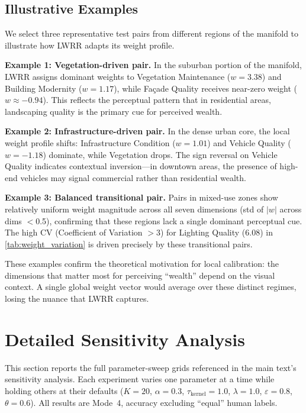\documentclass[runningheads]{llncs}
\begin{document}
\subsection{Illustrative Examples}

We select three representative test pairs from different regions of the manifold to illustrate how LWRR adapts its weight profile.

\medskip\noindent\textbf{Example 1: Vegetation-driven pair.}
In the suburban portion of the manifold, LWRR assigns dominant weights to Vegetation Maintenance ($w{=}3.38$) and Building Modernity ($w{=}1.17$), while Fa\c{c}ade Quality receives near-zero weight ($w{\approx}-0.94$).
This reflects the perceptual pattern that in residential areas, landscaping quality is the primary cue for perceived wealth.

\medskip\noindent\textbf{Example 2: Infrastructure-driven pair.}
In the dense urban core, the local weight profile shifts: Infrastructure Condition ($w{=}1.01$) and Vehicle Quality ($w{=}-1.18$) dominate, while Vegetation drops.
The sign reversal on Vehicle Quality indicates contextual inversion---in downtown areas, the presence of high-end vehicles may signal commercial rather than residential wealth.

\medskip\noindent\textbf{Example 3: Balanced transitional pair.}
Pairs in mixed-use zones show relatively uniform weight magnitude across all seven dimensions (std of $|w|$ across dims $<$0.5), confirming that these regions lack a single dominant perceptual cue.
The high CV (Coefficient of Variation $>$3) for Lighting Quality (6.08) in \cref{tab:weight_variation} is driven precisely by these transitional pairs.

\medskip
These examples confirm the theoretical motivation for local calibration: the dimensions that matter most for perceiving ``wealth'' depend on the visual context.
A single global weight vector would average over these distinct regimes, losing the nuance that LWRR captures.


\section{Detailed Sensitivity Analysis}
\label{sec:sensitivity_full}

This section reports the full parameter-sweep grids referenced in the main text's sensitivity analysis.
Each experiment varies one parameter at a time while holding others at their defaults ($K{=}20$, $\alpha{=}0.3$, $\tau_{\mathrm{kernel}}{=}1.0$, $\lambda{=}1.0$, $\varepsilon{=}0.8$, $\theta{=}0.6$).
All results are Mode~4, accuracy excluding ``equal'' human labels.
\end{document}
